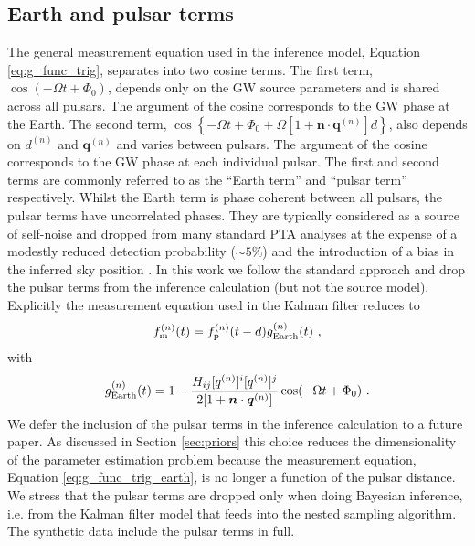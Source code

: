 \documentclass[fleqn,usenatbib,useAMS]{mnras}
\begin{document}
\subsection{Earth and pulsar terms}\label{sec:earth_psr_terms}
The general measurement equation used in the inference model, Equation \eqref{eq:g_func_trig}, separates into two cosine terms. The first term, $\cos(-\Omega t + \Phi_0)$, depends only on the GW source parameters and is shared across all pulsars. The argument of the cosine corresponds to the GW phase at the Earth.  The second term, $\cos \left \{-\Omega t +\Phi_0 + \Omega \left[1 + \boldsymbol{n}\cdot \boldsymbol{q}^{(n)} \right]  d \right \}$, also depends on $d^{(n)}$ and $\boldsymbol{q}^{(n)}$ and varies between pulsars. The argument of the cosine corresponds to the GW phase at each individual pulsar. The first and second terms are commonly referred to as the ``Earth term'' and ``pulsar term'' respectively. Whilst the Earth term is phase coherent between all pulsars, the pulsar terms have uncorrelated phases. They are typically considered as a source of self-noise and dropped from many standard PTA analyses \citep[e.g.][]{Sesana2010,Babak2012,Petiteau2013,Zhu2015,Taylors2016,Goldstein2018,Charisi2023arXiv230403786C} at the expense of a modestly reduced detection probability ($\sim 5 \%$) and the introduction of a bias in the inferred sky position \citep{Zhupulsarterms,Chen2022}. In this work we follow the standard approach and drop the pulsar terms from the inference calculation (but not the source model). Explicitly the measurement equation used in the Kalman filter reduces to
\begin{equation}
		f_{\rm m}^{(n)}(t) = f_{\rm p}^{(n)}(t-d) g^{(n)}_{\rm Earth}(t) \ , 
		\label{eq:measuremen_earth}
	\end{equation}
	with
	\begin{equation}
		g^{(n)}_{\rm Earth}(t) = 1 - \frac{ H_{ij}[q^{(n)}]^i [q^{(n)}]^j}{2[1 + \boldsymbol{n}\cdot \boldsymbol{q}^{(n)}] }  \cos(-\Omega t +\Phi_0)  \ .
		\label{eq:g_func_trig_earth}
	\end{equation}
	We defer the inclusion of the pulsar terms in the inference calculation to a future paper. As discussed in Section \ref{sec:priors} this choice reduces the dimensionality of the parameter estimation problem because the measurement equation, Equation \eqref{eq:g_func_trig_earth}, is no longer a function of the pulsar distance.  We stress that the pulsar terms are dropped only when doing Bayesian inference, i.e. from the Kalman filter model that feeds into the nested sampling algorithm. The synthetic data include the pulsar terms in full. \newline 
	
\end{document}
